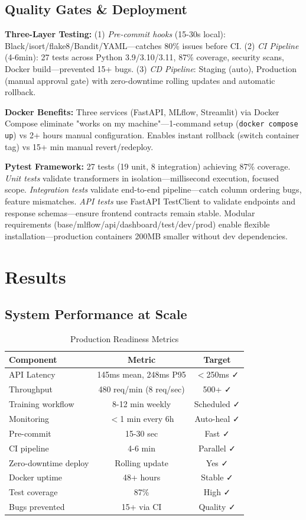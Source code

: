 \documentclass[11pt,a4paper]{article}
\begin{document}
\subsection{Quality Gates \& Deployment}

\textbf{Three-Layer Testing:} (1) \textit{Pre-commit hooks} (15-30s local): Black/isort/flake8/Bandit/YAML—catches 80\% issues before CI. (2) \textit{CI Pipeline} (4-6min): 27 tests across Python 3.9/3.10/3.11, 87\% coverage, security scans, Docker build—prevented 15+ bugs. (3) \textit{CD Pipeline}: Staging (auto), Production (manual approval gate) with zero-downtime rolling updates and automatic rollback.

\textbf{Docker Benefits:} Three services (FastAPI, MLflow, Streamlit) via Docker Compose eliminate "works on my machine"—1-command setup (\texttt{docker compose up}) vs 2+ hours manual configuration. Enables instant rollback (switch container tag) vs 15+ min manual revert/redeploy.

\textbf{Pytest Framework:} 27 tests (19 unit, 8 integration) achieving 87\% coverage. \textit{Unit tests} validate transformers in isolation—millisecond execution, focused scope. \textit{Integration tests} validate end-to-end pipeline—catch column ordering bugs, feature mismatches. \textit{API tests} use FastAPI TestClient to validate endpoints and response schemas—ensure frontend contracts remain stable. Modular requirements (base/mlflow/api/dashboard/test/dev/prod) enable flexible installation—production containers 200MB smaller without dev dependencies.

\section{Results}

\subsection{System Performance at Scale}

\begin{table}[h]
\centering
\caption{Production Readiness Metrics}
\small
\begin{tabular}{lcc}
\toprule
\textbf{Component} & \textbf{Metric} & \textbf{Target} \\
\midrule
API Latency & 145ms mean, 248ms P95 & $<$250ms ✓ \\
Throughput & 480 req/min (8 req/sec) & 500+ ✓ \\
Training workflow & 8-12 min weekly & Scheduled ✓ \\
Monitoring & $<$1 min every 6h & Auto-heal ✓ \\
Pre-commit & 15-30 sec & Fast ✓ \\
CI pipeline & 4-6 min & Parallel ✓ \\
Zero-downtime deploy & Rolling update & Yes ✓ \\
Docker uptime & 48+ hours & Stable ✓ \\
Test coverage & 87\% & High ✓ \\
Bugs prevented & 15+ via CI & Quality ✓ \\
\bottomrule
\end{tabular}
\end{table}
\end{document}
